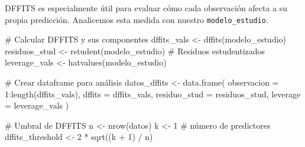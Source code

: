 \documentclass[
  letterpaper,
  DIV=11,
  numbers=noendperiod]{scrreprt}
\newenvironment{Shaded}{\begin{snugshade}}{\end{snugshade}}
\newcommand{\AttributeTok}[1]{\textcolor[rgb]{0.40,0.45,0.13}{#1}}
\newcommand{\CommentTok}[1]{\textcolor[rgb]{0.37,0.37,0.37}{#1}}
\newcommand{\DecValTok}[1]{\textcolor[rgb]{0.68,0.00,0.00}{#1}}
\newcommand{\FunctionTok}[1]{\textcolor[rgb]{0.28,0.35,0.67}{#1}}
\newcommand{\NormalTok}[1]{\textcolor[rgb]{0.00,0.23,0.31}{#1}}
\newcommand{\OtherTok}[1]{\textcolor[rgb]{0.00,0.23,0.31}{#1}}
\newcommand{\SpecialCharTok}[1]{\textcolor[rgb]{0.37,0.37,0.37}{#1}}
\begin{document}
\begin{tcolorbox}[enhanced jigsaw, leftrule=.75mm, breakable, colbacktitle=quarto-callout-tip-color!10!white, bottomrule=.15mm, colframe=quarto-callout-tip-color-frame, toprule=.15mm, colback=white, coltitle=black, bottomtitle=1mm, left=2mm, title=\textcolor{quarto-callout-tip-color}{\faLightbulb}\hspace{0.5em}{Ejemplo: Cálculo y análisis de DFFITS}, opacityback=0, arc=.35mm, opacitybacktitle=0.6, toptitle=1mm, titlerule=0mm, rightrule=.15mm]

DFFITS es especialmente útil para evaluar cómo cada observación afecta a
su propia predicción. Analicemos esta medida con nuestro
\texttt{modelo\_estudio}.

\begin{Shaded}
\begin{Highlighting}[]
\CommentTok{\# Calcular DFFITS y sus componentes}
\NormalTok{dffits\_vals }\OtherTok{\textless{}{-}} \FunctionTok{dffits}\NormalTok{(modelo\_estudio)}
\NormalTok{residuos\_stud }\OtherTok{\textless{}{-}} \FunctionTok{rstudent}\NormalTok{(modelo\_estudio)  }\CommentTok{\# Residuos estudentizados}
\NormalTok{leverage\_vals }\OtherTok{\textless{}{-}} \FunctionTok{hatvalues}\NormalTok{(modelo\_estudio)}

\CommentTok{\# Crear dataframe para análisis}
\NormalTok{datos\_dffits }\OtherTok{\textless{}{-}} \FunctionTok{data.frame}\NormalTok{(}
  \AttributeTok{observacion =} \DecValTok{1}\SpecialCharTok{:}\FunctionTok{length}\NormalTok{(dffits\_vals),}
  \AttributeTok{dffits =}\NormalTok{ dffits\_vals,}
  \AttributeTok{residuo\_stud =}\NormalTok{ residuos\_stud,}
  \AttributeTok{leverage =}\NormalTok{ leverage\_vals}
\NormalTok{)}

\CommentTok{\# Umbral de DFFITS}
\NormalTok{n }\OtherTok{\textless{}{-}} \FunctionTok{nrow}\NormalTok{(datos)}
\NormalTok{k }\OtherTok{\textless{}{-}} \DecValTok{1}  \CommentTok{\# número de predictores}
\NormalTok{dffits\_threshold }\OtherTok{\textless{}{-}} \DecValTok{2} \SpecialCharTok{*} \FunctionTok{sqrt}\NormalTok{((k }\SpecialCharTok{+} \DecValTok{1}\NormalTok{) }\SpecialCharTok{/}\NormalTok{ n)}


\end{Highlighting}
\end{Shaded}
\end{tcolorbox}
\end{document}
